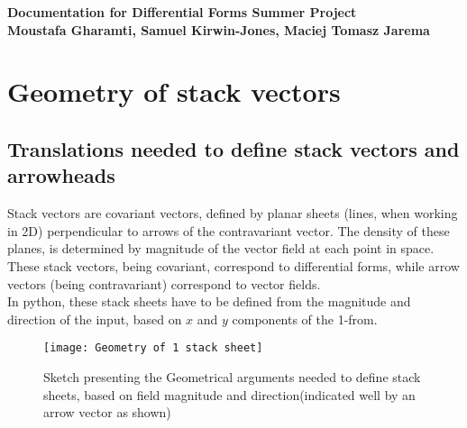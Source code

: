 \documentclass[11]{report}
\begin{document}
\begin{titlepage}
\begin{center}
\vspace*{1cm}
\LARGE
\textbf{Documentation for Differential Forms Summer Project}\\
\vspace{5cm}
\normalsize
\textbf{Moustafa Gharamti, Samuel Kirwin-Jones, Maciej Tomasz Jarema}\\

\end{center}
\end{titlepage}

\section{Geometry of stack vectors}

\subsection{Translations needed to define stack vectors and arrowheads}

Stack vectors are covariant vectors, defined by planar sheets (lines, when working in 2D) perpendicular to arrows of the contravariant vector. The density of these planes, is determined by magnitude of the vector field at each point in space. These stack vectors, being covariant, correspond to differential forms, while arrow vectors (being contravariant) correspond to vector fields.\\
In python, these stack sheets have to be defined from the magnitude and direction of the input, based on \(x\) and \(y\) components of the 1-from.

\begin{figure}[H]
	\centering
	\graphicspath{ {c:/Users/macus/Desktop/Uni/summer internships/Moustafa - Differential Forms/images/} }
	\texttt{[image: Geometry of 1 stack sheet]}
	\caption{Sketch presenting the Geometrical arguments needed to define stack sheets, based on field magnitude and direction(indicated well by an arrow vector as shown)}
	\label{fig:1 sheet}
\end{figure}
\end{document}
